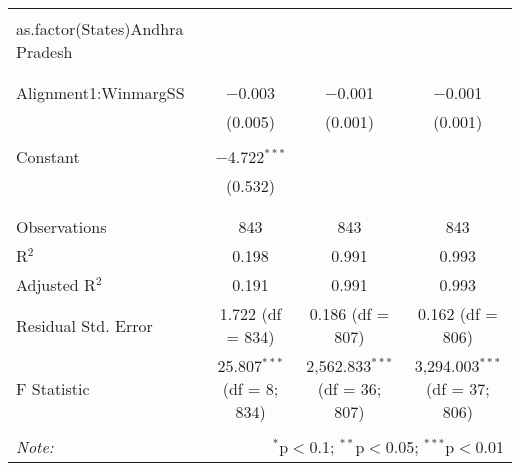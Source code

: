 \begin{table}[!htbp]
\begin{tabular}{@{\extracolsep{5pt}}lccc}
  & & & \\ 
 as.factor(States)Andhra Pradesh &  &  &  \\ 
  &  &  &  \\ 
  & & & \\ 
 Alignment1:WinmargSS & $-$0.003 & $-$0.001 & $-$0.001 \\ 
  & (0.005) & (0.001) & (0.001) \\ 
  & & & \\ 
 Constant & $-$4.722$^{***}$ &  &  \\ 
  & (0.532) &  &  \\ 
  & & & \\ 
\hline \\[-1.8ex] 
Observations & 843 & 843 & 843 \\ 
R$^{2}$ & 0.198 & 0.991 & 0.993 \\ 
Adjusted R$^{2}$ & 0.191 & 0.991 & 0.993 \\ 
Residual Std. Error & 1.722 (df = 834) & 0.186 (df = 807) & 0.162 (df = 806) \\ 
F Statistic & 25.807$^{***}$ (df = 8; 834) & 2,562.833$^{***}$ (df = 36; 807) & 3,294.003$^{***}$ (df = 37; 806) \\ 
\hline 
\hline \\[-1.8ex] 
\textit{Note:}  & \multicolumn{3}{r}{$^{*}$p$<$0.1; $^{**}$p$<$0.05; $^{***}$p$<$0.01} \\ 
\end{tabular} 
\end{table} 
